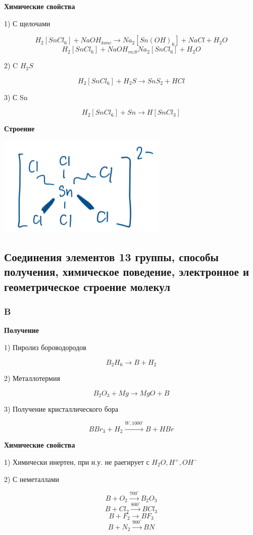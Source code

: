 \documentclass[14pt,a4paper]{scrartcl}
\begin{document}
\textbf{Химические свойства}

1) С щелочами

$$H_2[SnCl_6] + NaOH_{konc} \rightarrow Na_2[Sn(OH)_6] + NaCl + H_2O$$
$$H_2[SnCl_6] + NaOH_{razb} Na_2[SnCl_6] + H_2O$$

2) C $H_2S$

$$H_2[SnCl_6] + H_2S \rightarrow SnS_2 + HCl$$

3) С Sn

$$H_2[SnCl_6] + Sn \rightarrow H[SnCl_3]$$

\textbf{Строение}

\includegraphics{10v9.png}

\subsection{Соединения элементов 13 группы, способы получения, химическое поведение, электронное и геометрическое строение молекул}

\subsubsection{B}

\textbf{Получение}

1) Пиролиз бороводородов

$$B_2H_6 \rightarrow B + H_2$$

2) Металлотермия

$$B_2O_3 + Mg \rightarrow MgO + B$$

3) Получение кристаллического бора

$$BBr_3 + H_2 \xrightarrow{W, 1000^{\circ}} B + HBr$$

\textbf{Химические свойства}

1) Химически инертен, при н.у.  не раегирует с $H_2O, H^+, OH^-$

2) С неметаллами

$$B + O_2 \xrightarrow{700^{\circ}} B_2O_3$$
$$B + Cl_2 \xrightarrow{800^{\circ}} BCl_3$$
$$B + F_2 \rightarrow BF_3$$
$$B+ N_2 \xrightarrow{900^{\circ}} BN$$
\end{document}
